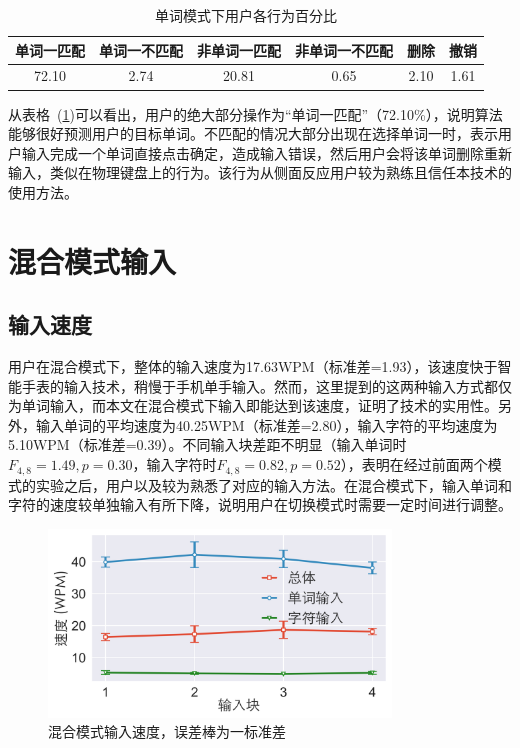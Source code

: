 \begin{table}[h]
  \centering
  \begin{minipage}[t]{0.9\linewidth} %
  \caption[单词模式下用户各行为百分比]{单词模式下用户各行为百分比}
  \label{tab:word-stat}
    \centering
    \begin{tabularx}{\linewidth}{cccccc}
      \toprule[1.5pt]
      单词一匹配 & 单词一不匹配 & 非单词一匹配 & 非单词一不匹配 & 删除 & 撤销\\\midrule[1pt]
      72.10 & 2.74 & 20.81 & 0.65 & 2.10 & 1.61\\
      \bottomrule[1.5pt]
    \end{tabularx}
  \end{minipage}
\end{table}

从表格~(\ref{tab:word-stat})可以看出，用户的绝大部分操作为“单词一匹配”（72.10\%），说明算法能够很好预测用户的目标单词。不匹配的情况大部分出现在选择单词一时，表示用户输入完成一个单词直接点击确定，造成输入错误，然后用户会将该单词删除重新输入，类似在物理键盘上的行为。该行为从侧面反应用户较为熟练且信任本技术的使用方法。


\section{混合模式输入} 

\subsection{输入速度}
用户在混合模式下，整体的输入速度为17.63WPM（标准差=1.93），该速度快于智能手表的输入技术\cite{compass}，稍慢于手机单手输入\cite{2017blindtype}。然而，这里提到的这两种输入方式都仅为单词输入，而本文在混合模式下输入即能达到该速度，证明了技术的实用性。另外，输入单词的平均速度为40.25WPM（标准差=2.80），输入字符的平均速度为5.10WPM（标准差=0.39）。不同输入块差距不明显（输入单词时$F_{4,8}=1.49, p =0.30$，输入字符时$F_{4,8}=0.82, p =0.52$），表明在经过前面两个模式的实验之后，用户以及较为熟悉了对应的输入方法。在混合模式下，输入单词和字符的速度较单独输入有所下降，说明用户在切换模式时需要一定时间进行调整。

\begin{figure}[h] %
    \centering
    \includegraphics[height=5cm]{figures/wholespeed.png}
    \caption{混合模式输入速度，误差棒为一标准差}
    \label{fig:wholespeed}
\end{figure}


